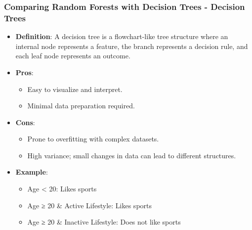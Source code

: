 \documentclass[aspectratio=169]{beamer}
\begin{document}
\begin{frame}[fragile]
    \frametitle{Comparing Random Forests with Decision Trees - Decision Trees}
    \begin{itemize}
        \item \textbf{Definition}: A decision tree is a flowchart-like tree structure where an internal node represents a feature, the branch represents a decision rule, and each leaf node represents an outcome.
        
        \item \textbf{Pros}:
        \begin{itemize}
            \item Easy to visualize and interpret.
            \item Minimal data preparation required.
        \end{itemize}
        
        \item \textbf{Cons}:
        \begin{itemize}
            \item Prone to overfitting with complex datasets.
            \item High variance; small changes in data can lead to different structures.
        \end{itemize}
        
        \item \textbf{Example}: 
        \begin{itemize}
            \item Age < 20: Likes sports
            \item Age ≥ 20 \& Active Lifestyle: Likes sports
            \item Age ≥ 20 \& Inactive Lifestyle: Does not like sports
        \end{itemize}
    \end{itemize}
\end{frame}
\end{document}
